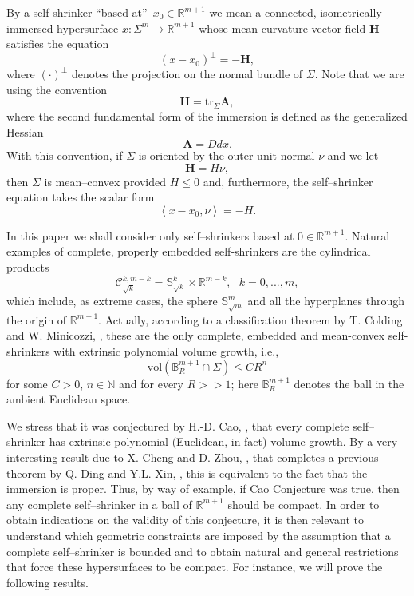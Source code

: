 \documentclass[11pt,leqno]{amsart}\usepackage{amsmath}
\numberwithin{equation}{section}
\begin{document}
By a self shrinker \textquotedblleft based at\textquotedblright\ $x_{0}\in\mathbb{R}^{m+1}$ we mean a connected, isometrically immersed hypersurface
$x\colon \Sigma^{m}\rightarrow\mathbb{R}^{m+1}$ whose mean curvature vector field
$\mathbf{H}$ satisfies the equation\[
\left(  x-x_{0}\right)  ^{\bot}=-\mathbf{H},
\]
where $\left(  \cdot\right)  ^{\bot}$ denotes the projection on the normal bundle of $\Sigma$.
Note that we are using the convention
\[
\mathbf{H}=\mathrm{tr}_{\Sigma}\mathbf{A},
\]
where the second fundamental form of the immersion is defined as the generalized Hessian
\[
\mathbf{A}=Ddx.
\]
With this convention, if $\Sigma$ is oriented by the outer unit normal $\nu$ and we let
\[
\mathbf{H}=H \nu,
\]
then $\Sigma$ is mean--convex provided $H\leq 0$ and, furthermore, the self--shrinker equation takes the scalar form
\[
\left\langle x-x_0 , \nu \right \rangle= -H.
\]

In this paper we shall consider only self--shrinkers based at $0\in \mathbb{R}^{m+1}$.
Natural examples of complete, properly embedded self-shrinkers are the cylindrical products
\begin{equation}\label{cylinders}
\mathcal{C}^{k,m-k}_{\sqrt{k}}=\mathbb{S}^{k}_{\sqrt{k}}\times \mathbb{R}^{m-k}, \text{ }k=0,...,m,
\end{equation}
which include, as extreme cases, the sphere $\mathbb{S}^{m}_{\sqrt{m}}$ and all the hyperplanes through the origin of $\mathbb{R}^{m+1}$.
Actually, according to a classification theorem by T. Colding and W. Minicozzi, \cite{CoMi-Annals2012}, these are the only complete, embedded
and mean-convex self-shrinkers with extrinsic polynomial volume growth, i.e.,
\[
\mathrm{vol}(\mathbb{B}^{m+1}_R \cap \Sigma) \leq CR^n
\]
for some $C>0$, $n \in \mathbb{N}$ and for every $R>>1$; here $\mathbb{B}^{m+1}_R$ denotes the ball in the ambient Euclidean space.

We stress that it was conjectured by H.-D. Cao, \cite{CaLi-CalcVar}, that every complete self--shrinker has extrinsic polynomial (Euclidean, in fact) volume growth. By a very interesting result due to X. Cheng and D. Zhou, \cite{ChZh-volume}, that completes a previous theorem by Q. Ding and Y.L. Xin, \cite{DiXi-proper}, this is equivalent to the fact that the immersion is proper. Thus, by way of example, if Cao Conjecture was true, then any complete self--shrinker in a ball of $\mathbb{R}^{m+1}$ should be compact. In order to obtain indications on the validity of this conjecture, it is then relevant to understand which geometric constraints are imposed by the assumption that a complete self--shrinker is bounded and to obtain natural and general restrictions that force these hypersurfaces to be compact. For instance, we will prove the following results.
\end{document}
